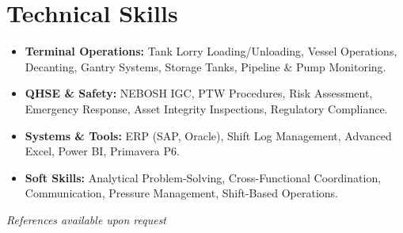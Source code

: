 \documentclass[11pt,a4paper]{article}
\begin{document}
\section{Technical Skills}
\begin{itemize}[label={\color{awesome-blue}\small\textbullet}, leftmargin=*, itemsep=0pt, parsep=0pt]
    \raggedright
    \item \textbf{Terminal Operations:} Tank Lorry Loading/Unloading, Vessel Operations, Decanting, Gantry Systems, Storage Tanks, Pipeline \& Pump Monitoring.
    \item \textbf{QHSE \& Safety:} NEBOSH IGC, PTW Procedures, Risk Assessment, Emergency Response, Asset Integrity Inspections, Regulatory Compliance.
    \item \textbf{Systems \& Tools:} ERP (SAP, Oracle), Shift Log Management, Advanced Excel, Power BI, Primavera P6.
    \item \textbf{Soft Skills:} Analytical Problem-Solving, Cross-Functional Coordination, Communication, Pressure Management, Shift-Based Operations.
\end{itemize}

\vfill
\begin{center}
    \textit{References available upon request}
\end{center}
\end{document}
